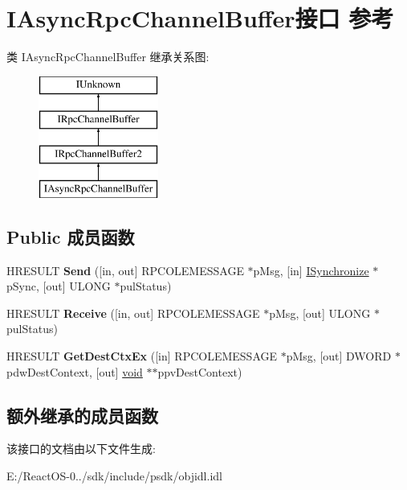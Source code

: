 \hypertarget{interface_i_async_rpc_channel_buffer}{}\section{I\+Async\+Rpc\+Channel\+Buffer接口 参考}
\label{interface_i_async_rpc_channel_buffer}
类 I\+Async\+Rpc\+Channel\+Buffer 继承关系图\+:\begin{figure}[H]
\begin{center}
\leavevmode
\includegraphics[height=4.000000cm]{interface_i_async_rpc_channel_buffer}
\end{center}
\end{figure}
\subsection*{Public 成员函数}
\begin{DoxyCompactItemize}
\item 
\mbox{\label{interface_i_async_rpc_channel_buffer_a75dd48608a179d208a661a649ec40d94}} 
H\+R\+E\+S\+U\+LT {\bfseries Send} (\mbox{[}in, out\mbox{]} R\+P\+C\+O\+L\+E\+M\+E\+S\+S\+A\+GE $\ast$p\+Msg, \mbox{[}in\mbox{]} \hyperlink{interface_i_synchronize}{I\+Synchronize} $\ast$p\+Sync, \mbox{[}out\mbox{]} U\+L\+O\+NG $\ast$pul\+Status)
\item 
\mbox{\label{interface_i_async_rpc_channel_buffer_a588dbd731a1e14f2c3727e50388b0a6a}} 
H\+R\+E\+S\+U\+LT {\bfseries Receive} (\mbox{[}in, out\mbox{]} R\+P\+C\+O\+L\+E\+M\+E\+S\+S\+A\+GE $\ast$p\+Msg, \mbox{[}out\mbox{]} U\+L\+O\+NG $\ast$pul\+Status)
\item 
\mbox{\label{interface_i_async_rpc_channel_buffer_a7e6dd26a00b4da2a7d3262ff9916878e}} 
H\+R\+E\+S\+U\+LT {\bfseries Get\+Dest\+Ctx\+Ex} (\mbox{[}in\mbox{]} R\+P\+C\+O\+L\+E\+M\+E\+S\+S\+A\+GE $\ast$p\+Msg, \mbox{[}out\mbox{]} D\+W\+O\+RD $\ast$pdw\+Dest\+Context, \mbox{[}out\mbox{]} \hyperlink{interfacevoid}{void} $\ast$$\ast$ppv\+Dest\+Context)
\end{DoxyCompactItemize}
\subsection*{额外继承的成员函数}


该接口的文档由以下文件生成\+:\begin{DoxyCompactItemize}
\item 
E\+:/\+React\+O\+S-\/0../sdk/include/psdk/objidl.\+idl\end{DoxyCompactItemize}
